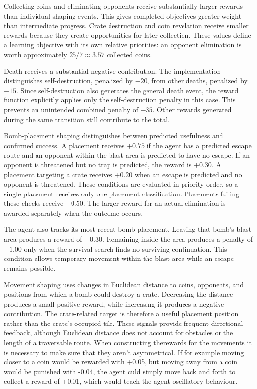 \documentclass[11pt,a4paper]{article}
\begin{document}
Collecting coins and eliminating opponents receive substantially
larger rewards than individual shaping events. This gives completed
objectives greater weight than intermediate progress. Crate
destruction and coin revelation receive smaller rewards because they
create opportunities for later collection. These values define a
learning objective with its own relative priorities: an opponent
elimination is worth approximately $25/7 \approx 3.57$ collected coins.

Death receives a substantial negative contribution. The implementation
distinguishes self-destruction, penalized by $-20$, from other deaths,
penalized by $-15$. Since self-destruction also generates the general
death event, the reward function explicitly applies only the
self-destruction penalty in this case. This prevents an unintended
combined penalty of $-35$. Other rewards generated during the same
transition still contribute to the total.

Bomb-placement shaping distinguishes between predicted usefulness
and confirmed success. A placement receives $+0.75$ if the agent has
a predicted escape route and an opponent within the blast area is
predicted to have no escape. If an opponent is threatened but no trap
is predicted, the reward is $+0.30$. A placement targeting a crate
receives $+0.20$ when an escape is predicted and no opponent is
threatened. These conditions are evaluated in priority order, so a
single placement receives only one placement classification.
Placements failing these checks receive $-0.50$. The larger reward
for an actual elimination is awarded separately when the outcome
occurs.

The agent also tracks its most recent bomb placement. Leaving that
bomb's blast area produces a reward of $+0.30$. Remaining inside the
area produces a penalty of $-1.00$ only when the survival search finds
no surviving continuation. This condition allows temporary movement
within the blast area while an escape remains possible.

Movement shaping uses changes in Euclidean distance to coins,
opponents, and positions from which a bomb could destroy a crate.
Decreasing the distance produces a small positive reward, while
increasing it produces a negative contribution. The crate-related
target is therefore a useful placement position rather than the
crate's occupied tile. These signals provide frequent directional
feedback, although Euclidean distance does not account for obstacles
or the length of a traversable route. When constructing therewards for the movements it is necessary to make sure that they aren't asymmetrical. If for example moving closer to a coin would be rewarded with +0.05, but moving away from a coin would be punished with -0.04, the agent culd simply move back and forth to collect a reward of +0.01, which would teach the agent oscillatory behaviour.
\end{document}

